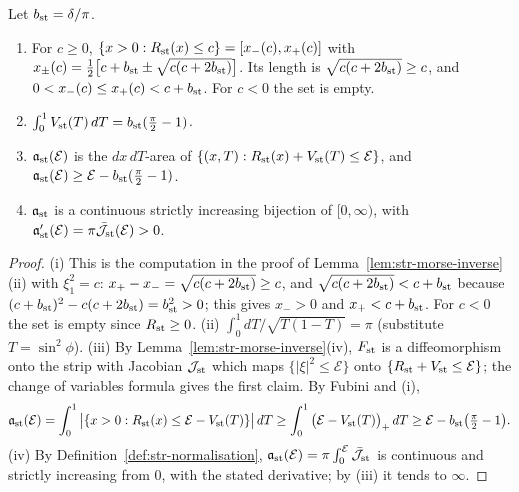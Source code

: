 \begin{lemma}\label{lem:str-area}
Let $b_{\rm st}=\delta/\pi$.
\begin{enumerate}[label=(\roman*)]
\item For $c\ge0$, $\{x>0:R_{\rm st}(x)\le c\}=[x_-(c),x_+(c)]$ with
$x_\pm(c)=\frac12\big[c+b_{\rm st}\pm\sqrt{c(c+2b_{\rm st})}\big]$. Its length is $\sqrt{c(c+2b_{\rm st})}\ge c$, and
$0<x_-(c)\le x_+(c)<c+b_{\rm st}$. For $c<0$ the set is empty.
\item $\int_0^1V_{\rm st}(T)\,dT=b_{\rm st}(\frac\pi2-1)$.
\item $\mathfrak a_{\rm st}(\mathcal E)$ is the $dx\,dT$-area of $\{(x,T):R_{\rm st}(x)+V_{\rm st}(T)\le\mathcal E\}$, and
$\mathfrak a_{\rm st}(\mathcal E)\ge\mathcal E-b_{\rm st}(\frac\pi2-1)$.
\item $\mathfrak a_{\rm st}$ is a continuous strictly increasing bijection of $[0,\infty)$, with
$\mathfrak a_{\rm st}'(\mathcal E)=\pi\bar{\mathcal J}_{\rm st}(\mathcal E)>0$.
\end{enumerate}
\end{lemma}

\begin{proof}
(i) This is the computation in the proof of Lemma~\ref{lem:str-morse-inverse}(ii) with $\xi_1^2=c$:
$x_+-x_-=\sqrt{c(c+2b_{\rm st})}\ge c$, and $\sqrt{c(c+2b_{\rm st})}<c+b_{\rm st}$ because
$(c+b_{\rm st})^2-c(c+2b_{\rm st})=b_{\rm st}^2>0$; this gives $x_->0$ and $x_+<c+b_{\rm st}$. For $c<0$ the set is empty since
$R_{\rm st}\ge0$.
(ii) $\int_0^1dT/\sqrt{T(1-T)}=\pi$ (substitute $T=\sin^2\phi$).
(iii) By Lemma~\ref{lem:str-morse-inverse}(iv), $F_{\rm st}$ is a diffeomorphism onto the strip with Jacobian $\mathcal J_{\rm st}$
which maps $\{|\xi|^2\le\mathcal E\}$ onto $\{R_{\rm st}+V_{\rm st}\le\mathcal E\}$; the change of variables formula gives
the first claim. By Fubini and (i),
\[
 \mathfrak a_{\rm st}(\mathcal E)=\int_0^1\big|\{x>0:R_{\rm st}(x)\le\mathcal E-V_{\rm st}(T)\}\big|\,dT
 \ge\int_0^1\big(\mathcal E-V_{\rm st}(T)\big)_+\,dT\ge\mathcal E-b_{\rm st}\big(\tfrac\pi2-1\big).
\]
(iv) By Definition~\ref{def:str-normalisation}, $\mathfrak a_{\rm st}(\mathcal E)=\pi\int_0^{\mathcal E}\bar{\mathcal J}_{\rm st}$ is
continuous and strictly increasing from $0$, with the stated derivative; by (iii) it tends to $\infty$.
\end{proof}

